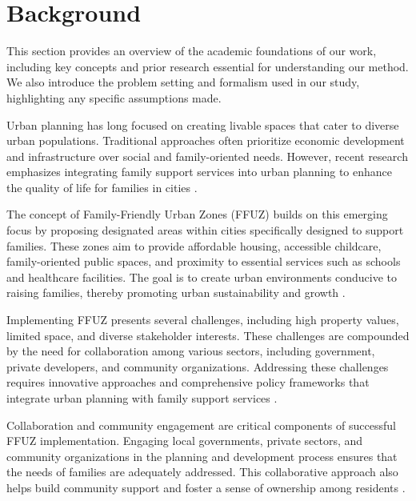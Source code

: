\documentclass{article} %
\begin{document}
\section{Background}
\label{sec:background}

This section provides an overview of the academic foundations of our work, including key concepts and prior research essential for understanding our method. We also introduce the problem setting and formalism used in our study, highlighting any specific assumptions made.

Urban planning has long focused on creating livable spaces that cater to diverse urban populations. Traditional approaches often prioritize economic development and infrastructure over social and family-oriented needs. However, recent research emphasizes integrating family support services into urban planning to enhance the quality of life for families in cities \citep{park2023generative, shanahan2023role}.

The concept of Family-Friendly Urban Zones (FFUZ) builds on this emerging focus by proposing designated areas within cities specifically designed to support families. These zones aim to provide affordable housing, accessible childcare, family-oriented public spaces, and proximity to essential services such as schools and healthcare facilities. The goal is to create urban environments conducive to raising families, thereby promoting urban sustainability and growth \citep{wang2023describe, liu2023agentbench}.

Implementing FFUZ presents several challenges, including high property values, limited space, and diverse stakeholder interests. These challenges are compounded by the need for collaboration among various sectors, including government, private developers, and community organizations. Addressing these challenges requires innovative approaches and comprehensive policy frameworks that integrate urban planning with family support services \citep{poledna2023economic, west2023agent}.

Collaboration and community engagement are critical components of successful FFUZ implementation. Engaging local governments, private sectors, and community organizations in the planning and development process ensures that the needs of families are adequately addressed. This collaborative approach also helps build community support and foster a sense of ownership among residents \citep{zhou2023peer}.
\end{document}
